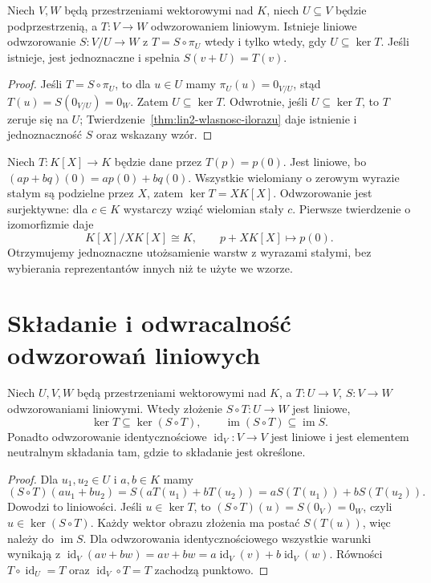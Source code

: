 \begin{stwierdzenie}
\label{prop:lin3-faktoryzacja-iloraz}
Niech \(V,W\) będą przestrzeniami wektorowymi
nad \(K\), niech \(U\subseteq V\) będzie
podprzestrzenią, a \(T\colon V\to W\) odwzorowaniem
liniowym. Istnieje liniowe odwzorowanie
\(S\colon V/U\to W\) z \(T=S\circ\pi_U\)
wtedy i tylko wtedy, gdy \(U\subseteq\ker T\).
Jeśli istnieje, jest jednoznaczne i spełnia
\(S(v+U)=T(v)\).
\end{stwierdzenie}
\begin{proof}
Jeśli \(T=S\circ\pi_U\), to dla \(u\in U\)
mamy \(\pi_U(u)=0_{V/U}\), stąd
\(T(u)=S(0_{V/U})=0_W\). Zatem
\(U\subseteq\ker T\).
Odwrotnie, jeśli \(U\subseteq\ker T\), to
\(T\) zeruje się na \(U\);
Twierdzenie~\ref{thm:lin2-wlasnosc-ilorazu}
daje istnienie i jednoznaczność \(S\)
oraz wskazany wzór.
\end{proof}

\begin{przyklad}
\label{prz:lin3-ewaluacja}
Niech \(T\colon K[X]\to K\) będzie
dane przez \(T(p)=p(0)\).
Jest liniowe, bo
\((ap+bq)(0)=ap(0)+bq(0)\).
Wszystkie wielomiany o zerowym wyrazie
stałym są podzielne przez \(X\), zatem
\(\ker T=XK[X]\).
Odwzorowanie jest surjektywne:
dla \(c\in K\) wystarczy wziąć wielomian stały \(c\).
Pierwsze twierdzenie o izomorfizmie daje
\[
 K[X]/XK[X]\cong K,\qquad
 p+XK[X]\longmapsto p(0).
\]
Otrzymujemy jednoznaczne utożsamienie warstw
z wyrazami stałymi, bez wybierania
reprezentantów innych niż te użyte we wzorze.
\end{przyklad}

\section{Składanie i odwracalność odwzorowań liniowych}
\label{sec:lin3-skladanie}

\begin{stwierdzenie}
\label{prop:lin3-skladanie}
Niech \(U,V,W\) będą przestrzeniami
wektorowymi nad \(K\), a \(T\colon U\to V\),
\(S\colon V\to W\) odwzorowaniami liniowymi.
Wtedy złożenie \(S\circ T\colon U\to W\) jest liniowe,
\[
 \ker T\subseteq\ker(S\circ T),\qquad
 \operatorname{im}(S\circ T)\subseteq\operatorname{im}S.
\]
Ponadto odwzorowanie identycznościowe
\(\operatorname{id}_V\colon V\to V\)
jest liniowe i jest elementem neutralnym
składania tam, gdzie to składanie jest określone.
\end{stwierdzenie}
\begin{proof}
Dla \(u_1,u_2\in U\) i \(a,b\in K\)
mamy
\[
 (S\circ T)(au_1+bu_2)
 =S(aT(u_1)+bT(u_2))
 =aS(T(u_1))+bS(T(u_2)).
\]
Dowodzi to liniowości. Jeśli \(u\in\ker T\),
to \((S\circ T)(u)=S(0_V)=0_W\),
czyli \(u\in\ker(S\circ T)\).
Każdy wektor obrazu złożenia ma postać
\(S(T(u))\), więc należy do \(\operatorname{im}S\).
Dla odwzorowania identycznościowego
wszystkie warunki wynikają z
\(\operatorname{id}_V(av+bw)=av+bw
 =a\operatorname{id}_V(v)+b\operatorname{id}_V(w)\).
Równości \(T\circ\operatorname{id}_U=T\)
oraz \(\operatorname{id}_V\circ T=T\)
zachodzą punktowo.
\end{proof}

